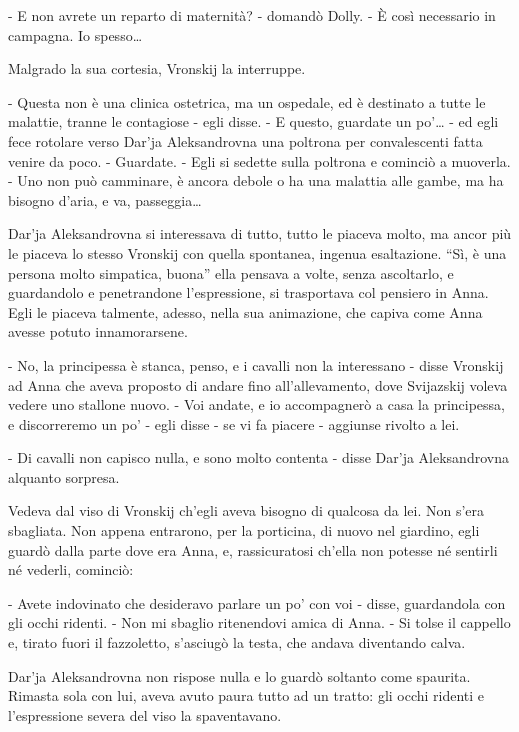 - E non avrete un reparto di maternità? - domandò Dolly. - È così necessario in campagna. Io spesso\ldots{} 

Malgrado la sua cortesia, Vronskij la interruppe. 

- Questa non è una clinica ostetrica, ma un ospedale, ed è destinato a tutte le malattie, tranne le contagiose - egli disse. - E questo, guardate un po'\ldots{} - ed egli fece rotolare verso Dar'ja Aleksandrovna una poltrona per convalescenti fatta venire da poco. - Guardate. - Egli si sedette sulla poltrona e cominciò a muoverla. - Uno non può camminare, è ancora debole o ha una malattia alle gambe, ma ha bisogno d'aria, e va, passeggia\ldots{} 

Dar'ja Aleksandrovna si interessava di tutto, tutto le piaceva molto, ma ancor più le piaceva lo stesso Vronskij con quella spontanea, ingenua esaltazione. ``Sì, è una persona molto simpatica, buona'' ella pensava a volte, senza ascoltarlo, e guardandolo e penetrandone l'espressione, si trasportava col pensiero in Anna. Egli le piaceva talmente, adesso, nella sua animazione, che capiva come Anna avesse potuto innamorarsene. 

\label{xxi-5} 

- No, la principessa è stanca, penso, e i cavalli non la interessano - disse Vronskij ad Anna che aveva proposto di andare fino all'allevamento, dove Svijazskij voleva vedere uno stallone nuovo. - Voi andate, e io accompagnerò a casa la principessa, e discorreremo un po' - egli disse - se vi fa piacere - aggiunse rivolto a lei. 

- Di cavalli non capisco nulla, e sono molto contenta - disse Dar'ja Aleksandrovna alquanto sorpresa. 

Vedeva dal viso di Vronskij ch'egli aveva bisogno di qualcosa da lei. Non s'era sbagliata. Non appena entrarono, per la porticina, di nuovo nel giardino, egli guardò dalla parte dove era Anna, e, rassicuratosi ch'ella non potesse né sentirli né vederli, cominciò: 

- Avete indovinato che desideravo parlare un po' con voi - disse, guardandola con gli occhi ridenti. - Non mi sbaglio ritenendovi amica di Anna. - Si tolse il cappello e, tirato fuori il fazzoletto, s'asciugò la testa, che andava diventando calva. 

Dar'ja Aleksandrovna non rispose nulla e lo guardò soltanto come spaurita. Rimasta sola con lui, aveva avuto paura tutto ad un tratto: gli occhi ridenti e l'espressione severa del viso la spaventavano. 


